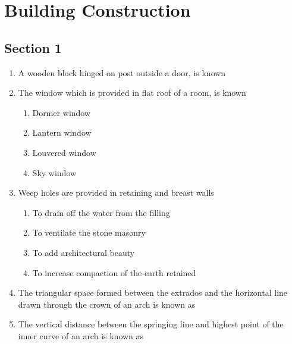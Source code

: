 \documentclass[11pt,a4paper]{article}
\begin{document}
\section{Building Construction}
\subsection*{Section 1}
\begin{enumerate}
\item{A wooden block hinged on post outside a door, is known}
\\
\item{The window which is provided in flat roof of a room, is known}
\begin{enumerate}[label=\Alph*.]
\item{Dormer window}
\item{Lantern window}
\item{Louvered window}
\item{Sky window}
\end{enumerate}
\item{Weep holes are provided in retaining and breast walls}
\begin{enumerate}[label=\Alph*.]
\item{To drain off the water from the filling}
\item{To ventilate the stone masonry}
\item{To add architectural beauty}
\item{To increase compaction of the earth retained}
\end{enumerate}
\item{The triangular space formed between the extrados and the horizontal line drawn through the crown of an arch is known as}
\\
\item{The vertical distance between the springing line and highest point of the inner curve of an arch is known as}

\end{enumerate}
\end{document}
